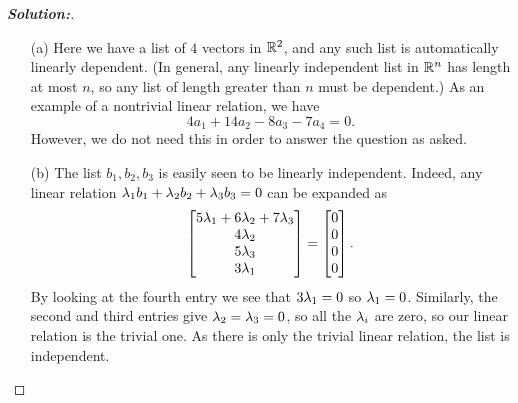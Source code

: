 \documentclass[a4paper]{amsart}
\theoremstyle{definition}
\newenvironment{solution}{\begin{proof}[\textbf{Solution:}] \vphantom{u}}{\end{proof}}
\begin{document}
\begin{solution}
 \begin{itemize}
  \item[(a)] Here we have a list of $4$ vectors in ${\mathbb{R}}^2$, and any
   such list is automatically linearly dependent.  (In general, any
   linearly independent list in ${\mathbb{R}}^n$ has length at most $n$, so any
   list of length greater than $n$ must be dependent.)  As an example
   of a nontrivial linear relation, we have 
   \[ 4a_1 + 14a_2 - 8a_3 - 7a_4 = 0. \]
   However, we do not need this in order to answer the question as
   asked.
  \item[(b)] The list $b_1,b_2,b_3$ is easily seen to be linearly
   independent.  Indeed, any linear relation
   $\lambda_1b_1+\lambda_2b_2+\lambda_3b_3=0$ can be expanded as 
   \[ \left[\begin{matrix} 5\lambda_1+6\lambda_2+7\lambda_3 \\ 4\lambda_2 \\ 5\lambda_3 \\ 3\lambda_1 \end{matrix}\right]
        = \left[\begin{matrix} 0 \\ 0 \\ 0 \\ 0 \end{matrix}\right]. 
   \]
   By looking at the fourth entry we see that $3\lambda_1=0$ so
   $\lambda_1=0$.  Similarly, the second and third entries give
   $\lambda_2=\lambda_3=0$, so all the $\lambda_i$ are zero, so our linear
   relation is the trivial one.  As there is only the trivial linear
   relation, the list is independent.


\end{itemize}
\end{solution}
\end{document}
